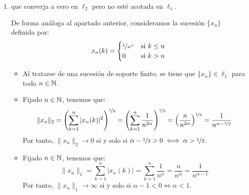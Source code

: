 \begin{ejercicio}
\begin{enumerate}
\begin{itemize}
        Por tanto, $\|x_n\|_\infty \to 0$ si y solo si $\alpha > 0$.
        \item Fijado $n \in \bb{N}$, tenemos que:
        \begin{equation*}
            \|x_n\|_2 = \left(\sum_{k=1}^\infty |x_n(k)|^2\right)^{\nicefrac{1}{2}} = \left(\sum_{k=1}^n \frac{1}{n^{2\alpha}}\right)^{\nicefrac{1}{2}} = \left(\frac{n}{n^{2\alpha}}\right)^{\nicefrac{1}{2}} = \frac{1}{n^{\alpha - \nicefrac{1}{2}}}
        \end{equation*}
        Por tanto, $\|x_n\|_2 \to \infty$ si y solo si $\alpha-\nicefrac{1}{2} < 0 \iff \alpha < \nicefrac{1}{2}$.
    \end{itemize}

    Por tanto, para que $\{x_n\}$ cumpla las condiciones del enunciado, basta con tomar $\alpha\in \bb{R}$ tal que:
    \begin{equation*}
        0 < \alpha < \nicefrac{1}{2}
    \end{equation*}



    \item que converja a cero en $\ell_2$ pero no esté acotada en $\ell_1$.
    
    De forma análoga al apartado anterior, consideramos la sucesión $\{x_n\}$ definida por:
    \begin{equation*}
        x_n(k) = \begin{cases}
            \nicefrac{1}{n^\alpha} & \text{si } k \leq n\\
            0 & \text{si } k > n
        \end{cases}
    \end{equation*}
    \begin{itemize}
        \item Al tratarse de una sucesión de soporte finito, se tiene que $\{x_n\} \in \ell_1$ para todo $n \in \bb{N}$.
        \item Fijado $n \in \bb{N}$, tenemos que:
        \begin{equation*}
            \|x_n\|_2 = \left(\sum_{k=1}^n |x_n(k)|^2\right)^{\nicefrac{1}{2}} = \left(\sum_{k=1}^n \frac{1}{n^{2\alpha}}\right)^{\nicefrac{1}{2}} = \left(\frac{n}{n^{2\alpha}}\right)^{\nicefrac{1}{2}} = \frac{1}{n^{\alpha - \nicefrac{1}{2}}}
        \end{equation*}
        Por tanto, $\|x_n\|_2 \to 0$ si y solo si $\alpha-\nicefrac{1}{2} > 0 \iff \alpha > \nicefrac{1}{2}$.
        \item Fijado $n \in \bb{N}$, tenemos que:
        \begin{equation*}
            \|x_n\|_1 = \sum_{k=1}^n |x_n(k)| = \sum_{k=1}^n \frac{1}{n^\alpha} = \frac{n}{n^\alpha} = \frac{1}{n^{\alpha - 1}}
        \end{equation*}
        Por tanto, $\|x_n\|_1 \to \infty$ si y solo si $\alpha-1 < 0 \iff \alpha < 1$.
    \end{itemize}


\end{enumerate}
\end{ejercicio}
